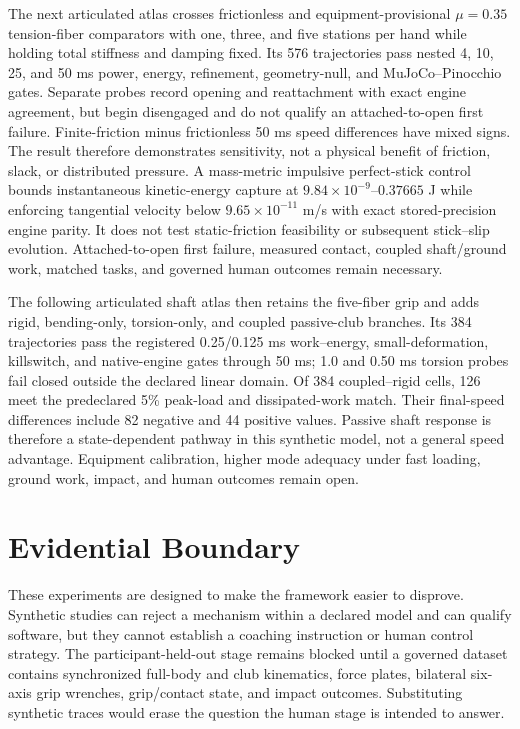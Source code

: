 \documentclass[
  letterpaper,
]{report}
\begin{document}
The next articulated atlas crosses frictionless and
equipment-provisional \(\mu=0.35\) tension-fiber comparators with one,
three, and five stations per hand while holding total stiffness and
damping fixed. Its 576 trajectories pass nested 4, 10, 25, and 50 ms
power, energy, refinement, geometry-null, and MuJoCo--Pinocchio gates.
Separate probes record opening and reattachment with exact engine
agreement, but begin disengaged and do not qualify an attached-to-open
first failure. Finite-friction minus frictionless 50 ms speed
differences have mixed signs. The result therefore demonstrates
sensitivity, not a physical benefit of friction, slack, or distributed
pressure. A mass-metric impulsive perfect-stick control bounds
instantaneous kinetic-energy capture at
\(9.84\times10^{-9}\)--\(0.37665\) J while enforcing tangential velocity
below \(9.65\times10^{-11}\) m/s with exact stored-precision engine
parity. It does not test static-friction feasibility or subsequent
stick--slip evolution. Attached-to-open first failure, measured contact,
coupled shaft/ground work, matched tasks, and governed human outcomes
remain necessary.

The following articulated shaft atlas then retains the five-fiber grip
and adds rigid, bending-only, torsion-only, and coupled passive-club
branches. Its 384 trajectories pass the registered 0.25/0.125 ms
work--energy, small-deformation, killswitch, and native-engine gates
through 50 ms; 1.0 and 0.50 ms torsion probes fail closed outside the
declared linear domain. Of 384 coupled--rigid cells, 126 meet the
predeclared 5\% peak-load and dissipated-work match. Their final-speed
differences include 82 negative and 44 positive values. Passive shaft
response is therefore a state-dependent pathway in this synthetic model,
not a general speed advantage. Equipment calibration, higher mode
adequacy under fast loading, ground work, impact, and human outcomes
remain open.

\section{Evidential Boundary}\label{evidential-boundary}

These experiments are designed to make the framework easier to disprove.
Synthetic studies can reject a mechanism within a declared model and can
qualify software, but they cannot establish a coaching instruction or
human control strategy. The participant-held-out stage remains blocked
until a governed dataset contains synchronized full-body and club
kinematics, force plates, bilateral six-axis grip wrenches, grip/contact
state, and impact outcomes. Substituting synthetic traces would erase
the question the human stage is intended to answer.
\end{document}

